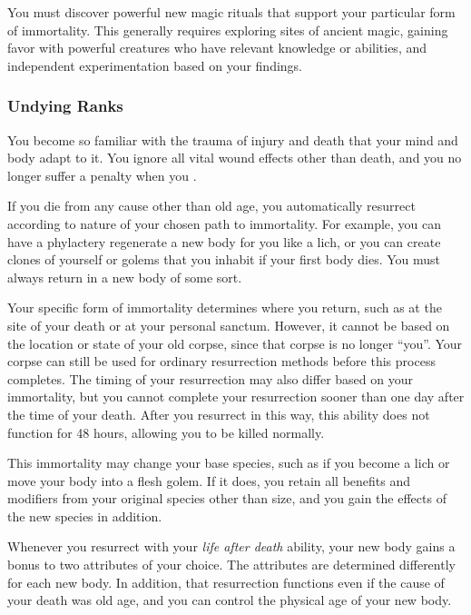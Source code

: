      You must discover powerful new magic rituals that support your particular form of immortality. This generally requires exploring sites of ancient magic, gaining favor with powerful creatures who have relevant knowledge or abilities, and independent experimentation based on your findings.

    \subsubsection{Undying Ranks}

       You become so familiar with the trauma of injury and death that your mind and body adapt to it.
      You ignore all vital wound effects other than death, and you no longer suffer a penalty when you .

       If you die from any cause other than old age, you automatically resurrect according to nature of your chosen path to immortality.
      For example, you can have a phylactery regenerate a new body for you like a lich, or you can create clones of yourself or golems that you inhabit if your first body dies.
      You must always return in a new body of some sort.

      Your specific form of immortality determines where you return, such as at the site of your death or at your personal sanctum.
      However, it cannot be based on the location or state of your old corpse, since that corpse is no longer ``you''.
      Your corpse can still be used for ordinary resurrection methods before this process completes.
      The timing of your resurrection may also differ based on your immortality, but you cannot complete your resurrection sooner than one day after the time of your death. After you resurrect in this way, this ability does not function for 48 hours, allowing you to be killed normally.

      This immortality may change your base species, such as if you become a lich or move your body into a flesh golem. If it does, you retain all benefits and modifiers from your original species other than size, and you gain the effects of the new species in addition.

       Whenever you resurrect with your \textit{life after death} ability, your new body gains a  bonus to two attributes of your choice.
      The attributes are determined differently for each new body.
      In addition, that resurrection functions even if the cause of your death was old age, and you can control the physical age of your new body.

